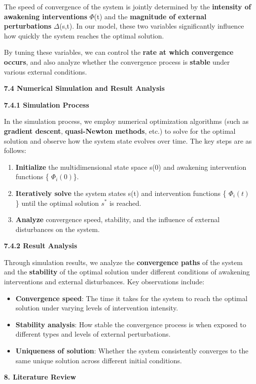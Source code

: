 \documentclass[a4paper]{article}
\begin{document}
The speed of convergence of the system is jointly determined by the \textbf{intensity of awakening interventions} $\Phi
$(t) and the \textbf{magnitude of external perturbations} $\Delta $(s,t). In our model, these two variables
significantly influence how quickly the system reaches the optimal solution.

By tuning these variables, we can control the \textbf{rate at which convergence occurs}, and also analyze whether the
convergence process is \textbf{stable} under various external conditions.

\textbf{7.4 Numerical Simulation and Result Analysis}

\textbf{7.4.1 Simulation Process}

In the simulation process, we employ numerical optimization algorithms (such as \textbf{gradient descent},
\textbf{quasi-Newton methods}, etc.) to solve for the optimal solution and observe how the system state evolves over
time. The key steps are as follows:

\begin{enumerate}[series=listWWNumxviii,label=\arabic*.,ref=\arabic*]
\item \textbf{Initialize} the multidimensional state space s(0) and awakening intervention functions \{ $\Phi
_i\left(0\right)$\}.
\item \textbf{Iteratively solve} the system states s(t) and intervention functions \{ $\Phi _i\left(t\right)$\} until
the optimal solution $s^{\ast }$ is reached.
\item \textbf{Analyze} convergence speed, stability, and the influence of external disturbances on the system.
\end{enumerate}
\textbf{7.4.2 Result Analysis}

Through simulation results, we analyze the \textbf{convergence paths} of the system and the \textbf{stability} of the
optimal solution under different conditions of awakening interventions and external disturbances. Key observations
include:

\begin{itemize}[series=listWWNumxix,label=[F0B7?]]
\item \textbf{Convergence speed}: The time it takes for the system to reach the optimal solution under varying levels of
intervention intensity.
\item \textbf{Stability analysis}: How stable the convergence process is when exposed to different types and levels of
external perturbations.
\item \textbf{Uniqueness of solution}: Whether the system consistently converges to the same unique solution across
different initial conditions.
\end{itemize}
{\centering\color[HTML]{595959}
\textbf{8. Literature Review}
\par}
\end{document}
